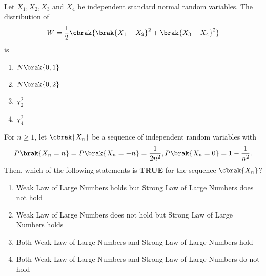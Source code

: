 \item Let $X_1,X_2,X_3 \text{ and } X_4$ be independent standard normal random variables. The distribution of
\begin{align*}
W = \frac{1}{2}\cbrak{\brak{X_1-X_2}^2 + \brak{X_3-X_4}^2}
\end{align*} is
\hfill{}
\begin{enumerate}
\item $N\brak{0,1}$
\item $N\brak{0,2}$
\item $\chi_{2}^{2}$
\item $\chi_{4}^{2}$
\end{enumerate}

\item For $n\geq 1$, let $\cbrak{X_n}$ be a sequence of independent random variables with
\begin{align*}
	P\brak{X_n = n} = P\brak{X_n = -n} = \frac{1}{2n^2}, P\brak{X_n = 0} = 1 - \frac{1}{n^2}.
\end{align*}
Then, which of the following statements is \textbf{TRUE} for the sequence $\cbrak{X_n}$?
\hfill{}
\begin{enumerate}
\item Weak Law of Large Numbers holds but Strong Law of Large Numbers does not hold
\item Weak Law of Large Numbers does not hold but Strong Law of Large Numbers holds
\item Both Weak Law of Large Numbers and Strong Law of Large Numbers hold
\item Both Weak Law of Large Numbers and Strong Law of Large Numbers do not hold
\end{enumerate}
